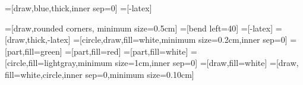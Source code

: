 \usepackage{algorithm}
\usepackage{algorithmic}
\usepackage{amsmath}
\usepackage{amssymb}
\usepackage{array}
\usepackage{blindtext}
\usepackage{booktabs}
\usepackage{colortbl}
\usepackage{comment}
\usepackage{etex}
\usepackage{float}
\usepackage[T1]{fontenc}
\usepackage{graphicx}
\usepackage[space]{grffile}
\usepackage[utf8]{inputenc}
\usepackage{multirow}
\usepackage{nag}
\usepackage{pgfplots}
\usepackage{pgfplotstable}
\usepackage{standalone}
\usepackage{tikz}
\usepackage{todonotes}
\usepackage{xspace}
\usepackage[bookmarks=false,pagebackref=false]{hyperref} %


\graphicspath{{figures//}}

\hypersetup{breaklinks=true}
\hypersetup{colorlinks=true}
\hypersetup{draft=false}
\hypersetup{linktoc=all}
\hypersetup{urlcolor=blue}


\usetikzlibrary{arrows,backgrounds,calc,external,fit,shapes}
\usetikzlibrary{pgfplots.groupplots}

=[draw,blue,thick,inner sep=0]
=[-latex]

=[draw,rounded corners, minimum size=0.5cm]
=[bend left=40]
=[-latex]
=[draw,thick,-latex]
=[circle,draw,fill=white,minimum size=0.2cm,inner sep=0]
=[part,fill=green]
=[part,fill=red]
=[part,fill=white]
=[circle,fill=lightgray,minimum size=1cm,inner sep=0]
=[draw,fill=white]
=[draw, fill=white,circle,inner sep=0,minimum size=0.10cm]

\tikzexternalize[prefix=ext/]

\pgfplotsset{compat=1.7}
\pgfplotsset{filter discard warning=false}

\graphicspath{{figures//}}

\DeclareMathOperator*{\argmin}{arg\,min}
\DeclareMathOperator*{\argmax}{arg\,max}

\renewcommand{\algorithmicrequire}{\textbf{Input:}}
\renewcommand{\algorithmicensure}{\textbf{Output:}}

\makeatletter
\newcommand*{\addFileDependency}[1]{%
  \typeout{(#1)}%
  \@addtofilelist{#1}%
  \IfFileExists{#1}{}{\typeout{No file #1.}}%
}
\makeatother


